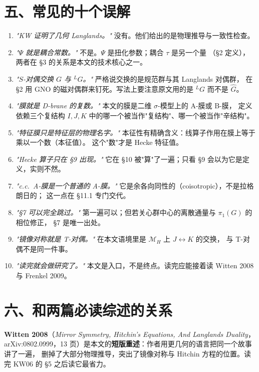 \documentclass[11pt,a4paper]{article}
\newcommand{\MH}{\mathcal{M}_H}
\newcommand{\Ldual}{{}^L\!G}
\newcommand{\kw}{\textsf{KW06}}
\begin{document}
\section*{五、常见的十个误解}

\begin{enumerate}[label=\arabic*.,leftmargin=2.2em]
  \item \emph{"KW 证明了几何 Langlands。"} 没有。他们给出的是物理推导与一致性检查。
  \item \emph{"$\Psi$ 就是耦合常数。"} 不是。$\Psi$ 是扭化参数；耦合 $\tau$ 是另一个量
        （\S2 定义），两者在 \S3 的关系是本文的技术核心之一。
  \item \emph{"$S$-对偶交换 $G$ 与 $\Ldual$。"} 严格说交换的是规范群与其 Langlands 对偶群，
        在 \S2 用 GNO 的磁对偶群来钉死。写法上要注意原文用的是 $\Ldual$ 而不是 $\hat G$。
  \item \emph{"膜就是 D-brane 的复数。"} 本文的膜是二维 $\sigma$-模型上的 A-膜或 B-膜，
        定义依赖三个复结构 $I,J,K$ 中的哪一个被当作"复结构"、哪一个被当作"辛结构"。
  \item \emph{"特征膜只是特征层的物理名字。"} 本征性有精确含义：线算子作用在膜上等于乘以一个数（本征值）。
        这个"数"才是 Hecke 特征值。
  \item \emph{"Hecke 算子只在 \S9 出现。"} 它在 \S10 被"算"了一遍；只看 \S9 会以为它是定义，实则不然。
  \item \emph{"c.c.\ A-膜是一个普通的 A-膜。"} 它是余各向同性的（coisotropic），不是拉格朗日的；
        这一点在 \S11.1 专门交代。
  \item \emph{"\S7 可以完全跳过。"} 第一遍可以；但若关心群中心的离散通量与 $\pi_1(G)$ 的相位修正，
        \S7 是唯一出处。
  \item \emph{"镜像对称就是 T-对偶。"} 在本文语境里是 $\MH${} 上 $J\leftrightarrow K$ 的交换，
        与 T-对偶不是同一件事。
  \item \emph{"读完就会做研究了。"} 本文是入口，不是终点。读完应能接着读 Witten 2008 与 Frenkel 2009。
\end{enumerate}

\section*{六、和两篇必读综述的关系}

\textbf{Witten 2008}（\emph{Mirror Symmetry, Hitchin's Equations, And Langlands Duality}，
arXiv:0802.0999，13 页）是本文的\textbf{短版重述}：作者用更几何的语言把同一个故事讲了一遍，
删掉了大部分物理推导，突出了镜像对称与 Hitchin 方程的位置。读完 \kw{} 的 \S5 之后读它最省力。
\end{document}
